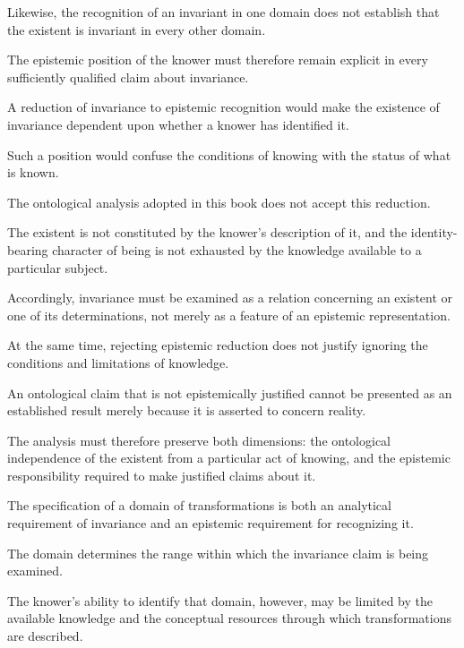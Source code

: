 Likewise, the recognition of
an invariant in one domain
does not establish that the
existent is invariant in every
other domain.

The epistemic position of the
knower must therefore remain
explicit in every sufficiently
qualified claim about invariance.


A reduction of invariance to
epistemic recognition would
make the existence of invariance
dependent upon whether a knower
has identified it.

Such a position would confuse
the conditions of knowing
with the status of what is
known.

The ontological analysis adopted
in this book does not accept
this reduction.

The existent is not constituted
by the knower's description
of it, and the identity-bearing
character of being is not
exhausted by the knowledge
available to a particular
subject.

Accordingly, invariance must
be examined as a relation
concerning an existent or
one of its determinations,
not merely as a feature of
an epistemic representation.

At the same time, rejecting
epistemic reduction does not
justify ignoring the conditions
and limitations of knowledge.

An ontological claim that
is not epistemically justified
cannot be presented as an
established result merely
because it is asserted to
concern reality.

The analysis must therefore
preserve both dimensions:
the ontological independence
of the existent from a
particular act of knowing,
and the epistemic responsibility
required to make justified
claims about it.


The specification of a domain
of transformations is both
an analytical requirement
of invariance and an epistemic
requirement for recognizing it.

The domain determines the
range within which the
invariance claim is being
examined.

The knower's ability to identify
that domain, however, may be
limited by the available
knowledge and the conceptual
resources through which
transformations are described.

